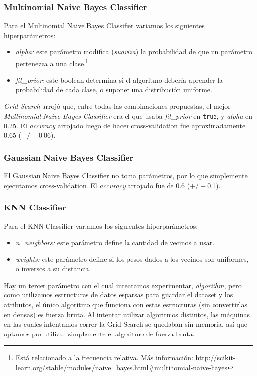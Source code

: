 \documentclass[a4paper]{article}
\begin{document}
\subsubsection{Multinomial Naive Bayes Classifier}
Para el Multinomial Naive Bayes Classifier variamos los siguientes hiperparámetros:
\begin{itemize}
	\item \textit{alpha:} este parámetro modifica (\textit{suaviza}) la probabilidad de que un parámetro pertenezca a una clase.\footnote{Está relacionado a la frecuencia relativa. Más información: http://scikit-learn.org/stable/modules/naive_bayes.html\#multinomial-naive-bayes}
	\item \textit{fit\_prior:} este boolean determina si el algoritmo debería aprender la probabilidad de cada clase, o suponer una distribución uniforme.
\end{itemize}

\textit{Grid Search} arrojó que, entre todas las combinaciones propuestas, el mejor \textit{Multinomial Naive Bayes Classifier} era el que usaba \textit{fit\_prior} en \texttt{true}, y \textit{alpha} en 0.25. \newline
\indent El \textit{accuracy} arrojado luego de hacer cross-validation fue aproximadamente 0.65 ($+/-$0.06).

\subsubsection{Gaussian Naive Bayes Classifier}
El Gaussian Naive Bayes Classifier no toma parámetros, por lo que simplemente ejecutamos cross-validation. El \textit{accuracy} arrojado fue de 0.6 ($+/-$0.1).

\subsubsection{KNN Classifier}
Para el KNN Classifier variamos los siguientes hiperparámetros:
\begin{itemize}
	\item \textit{n_neighbors:} este parámetro define la cantidad de vecinos a usar.
	\item \textit{weights:} este parámetro define si los pesos dados a los vecinos son uniformes, o inversos a su distancia.
\end{itemize}

Hay un tercer parámetro con el cual intentamos experimentar, \textit{algorithm}, pero como utilizamos estructuras de datos esparsas para guardar el dataset y los atributos, el único algoritmo que funciona con estas estructuras (sin convertirlas en densas) es fuerza bruta. Al intentar utilizar algoritmos distintos, las máquinas en las cuales intentamos correr la Grid Search se quedaban sin memoria, así que optamos por utilizar simplemente el algoritmo de fuerza bruta.
\end{document}
